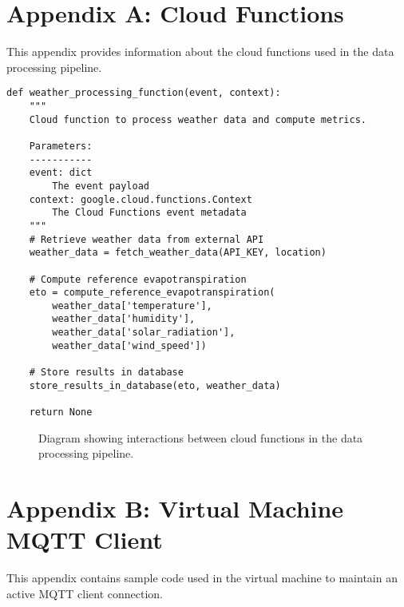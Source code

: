 \section{Appendix A: Cloud Functions}
\label{app:cloud-functions}

This appendix provides information about the cloud functions used in the data processing pipeline.

\begin{lstlisting}
def weather_processing_function(event, context):
    """
    Cloud function to process weather data and compute metrics.
    
    Parameters:
    -----------
    event: dict
        The event payload
    context: google.cloud.functions.Context
        The Cloud Functions event metadata
    """
    # Retrieve weather data from external API
    weather_data = fetch_weather_data(API_KEY, location)
    
    # Compute reference evapotranspiration
    eto = compute_reference_evapotranspiration(
        weather_data['temperature'], 
        weather_data['humidity'], 
        weather_data['solar_radiation'], 
        weather_data['wind_speed'])
    
    # Store results in database
    store_results_in_database(eto, weather_data)
    
    return None
\end{lstlisting}

\begin{figure}[h!]
\centering
\caption{Diagram showing interactions between cloud functions in the data processing pipeline.}
\label{fig:cloud-functions-diagram}
\end{figure}

\section{Appendix B: Virtual Machine MQTT Client}
\label{app:vm-mqtt}

This appendix contains sample code used in the virtual machine to maintain an active MQTT client connection.

